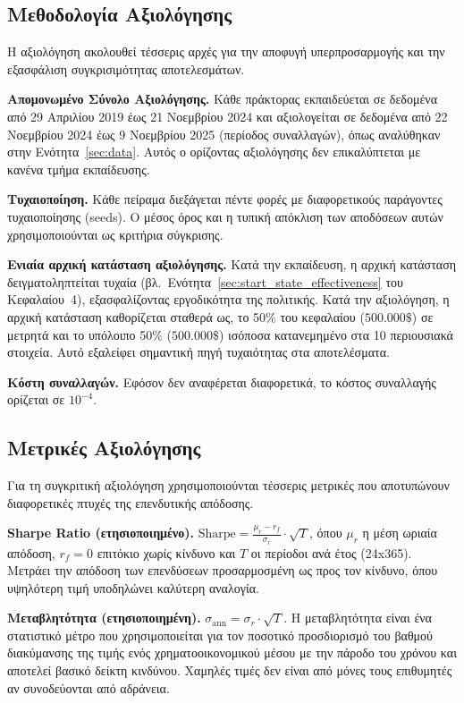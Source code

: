\subsection{Μεθοδολογία Αξιολόγησης}
\label{sec:exp-validation}

Η αξιολόγηση ακολουθεί τέσσερις αρχές για την αποφυγή υπερπροσαρμογής και την εξασφάλιση 
συγκρισιμότητας αποτελεσμάτων.

\textbf{Απομονωμένο Σύνολο Αξιολόγησης.} Κάθε πράκτορας εκπαιδεύεται σε δεδομένα από 29 Απριλίου 
2019 έως 21 Νοεμβρίου 2024 και αξιολογείται σε δεδομένα από 22 Νοεμβρίου 2024 έως 
9 Νοεμβρίου 2025 (περίοδος συναλλαγών), όπως αναλύθηκαν στην Ενότητα~\ref{sec:data}. 
Αυτός ο ορίζοντας αξιολόγησης δεν επικαλύπτεται με κανένα τμήμα εκπαίδευσης.

\textbf{Τυχαιοποίηση.} 
Κάθε πείραμα διεξάγεται πέντε φορές με διαφορετικούς παράγοντες τυχαιοποίησης (seeds). 
Ο μέσος όρος και η τυπική απόκλιση των αποδόσεων αυτών χρησιμοποιούνται ως κριτήρια σύγκρισης.

\textbf{Ενιαία αρχική κατάσταση αξιολόγησης.} Κατά την εκπαίδευση, η αρχική κατάσταση 
δειγματοληπτείται τυχαία (βλ.\ Ενότητα~\ref{sec:start_state_effectiveness} του Κεφαλαίου~4), 
εξασφαλίζοντας εργοδικότητα της πολιτικής. Κατά την αξιολόγηση, η αρχική κατάσταση 
καθορίζεται σταθερά ως, το 50\% του κεφαλαίου ($500{.}000\$$) σε μετρητά και 
το υπόλοιπο 50\% ($500{.}000\$$) ισόποσα κατανεμημένο στα 10 περιουσιακά στοιχεία. Αυτό εξαλείφει σημαντική 
πηγή τυχαιότητας στα αποτελέσματα.

\textbf{Κόστη συναλλαγών.} Εφόσον δεν αναφέρεται διαφορετικά, το κόστος
συναλλαγής ορίζεται σε $10^{-4}$.

\subsection{Μετρικές Αξιολόγησης}
\label{subsec:exp-metrics}

Για τη συγκριτική αξιολόγηση χρησιμοποιούνται τέσσερις μετρικές που αποτυπώνουν διαφορετικές πτυχές της επενδυτικής απόδοσης.

\textbf{Sharpe Ratio (ετησιοποιημένο).} $\text{Sharpe} = \frac{\mu_r - r_f}{\sigma_r} \cdot \sqrt{T}$, 
όπου $\mu_r$ η μέση ωριαία απόδοση, $r_f=0$ επιτόκιο χωρίς κίνδυνο και $T$ οι περίοδοι ανά έτος (24x365). 
Μετράει την απόδοση των επενδύσεων προσαρμοσμένη ως προς τον κίνδυνο, όπου υψηλότερη τιμή υποδηλώνει 
καλύτερη αναλογία.

\textbf{Μεταβλητότητα (ετησιοποιημένη).} $\sigma_{\text{ann}} = \sigma_r \cdot \sqrt{T}$. 
Η μεταβλητότητα είναι ένα στατιστικό μέτρο που χρησιμοποιείται για τον ποσοτικό προσδιορισμό 
του βαθμού διακύμανσης της τιμής ενός χρηματοοικονομικού μέσου με την πάροδο του χρόνου 
και αποτελεί βασικό δείκτη κινδύνου. 
Χαμηλές τιμές δεν είναι από μόνες τους επιθυμητές αν συνοδεύονται από αδράνεια.

